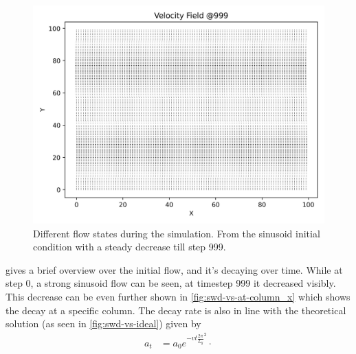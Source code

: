 \begin{figure}[H]
\begin{minipage}{0.33\textwidth}
        \includegraphics[width=\linewidth]{graphs/ShearWaveDecay/VelocityDistribution/velocity_field_999}
    \end{minipage}
    \caption{
        Different flow states during the simulation.
        From the sinusoid initial condition with a steady decrease till step 999.
    }
    \label{fig:swd-vs-velocity-fields}
\end{figure}

 gives a brief overview over the initial flow, and it's decaying over time.
While at step 0, a strong sinusoid flow can be seen, at timestep 999 it decreased visibly.
This decrease can be even further shown in \cref{fig:swd-vs-at-column_x} which shows the decay at a specific column.
The decay rate is also in line with the theoretical solution \cite{lecture} (as seen in \cref{fig:swd-vs-ideal}) given by
\begin{equation*}
    \begin{aligned}
        a_t &= a_0 e^{-vt \frac{2\pi}{L_y}^2} \cdot
    \end{aligned}
\end{equation*}

